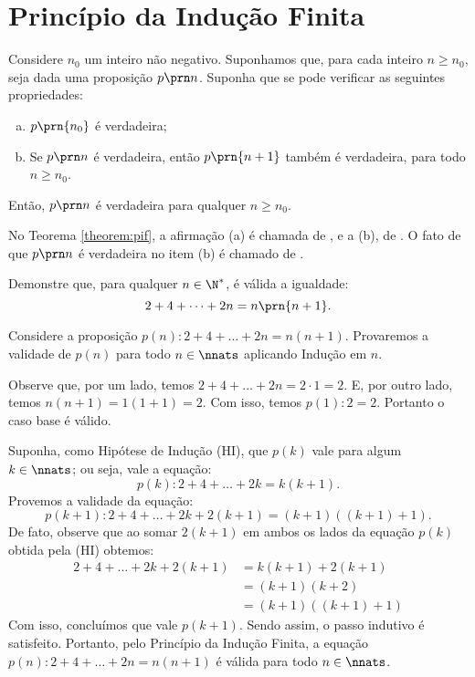\section{Princípio da Indução Finita}

\begin{theorem}
\label{theorem:pif}
Considere $n_0$ um inteiro não negativo. Suponhamos que, para cada inteiro $n \geq n_0$, seja dada uma proposição $p \prn n$. Suponha
que se pode verificar as seguintes propriedades:

\begin{enumerate}[(a)]
  \item $p \prn{n_0}$ é verdadeira;
  \item Se $p \prn n$ é verdadeira, então $p \prn {n+1}$ também
  é verdadeira, para todo $n \geq n_0$.
\end{enumerate}

\noindent Então, $p \prn n$ é verdadeira para qualquer $n \geq n_0$.
\end{theorem}

\begin{remark}
No Teorema \ref{theorem:pif}, a afirmação (a) é chamada de , e a (b), de . O fato de que $p \prn n$ é verdadeira no item (b) é chamado de .
\end{remark}

\begin{example}
Demonstre que, para qualquer $n \in \N^*$, é válida a igualdade:
%
$$2+ 4+ \dots + 2n = n \prn {n+1}.$$
\end{example}

\begin{solution}
Considere a proposição $p(n) : 2+4+\dots + 2n = n(n+1)$.
Provaremos a validade de $p(n)$ para todo $n \in \nnats$ aplicando Indução em $n$.

Observe que, por um lado, temos $2+ 4+ \dots + 2n = 2 \cdot 1 = 2$. E, por outro lado, temos $n(n + 1) = 1(1 + 1) = 2$. Com isso, temos $p(1): 2=2$. Portanto o caso base é válido.

Suponha, como Hipótese de Indução (HI), que $p(k)$ vale para algum $k \in \nnats$; ou seja, vale a equação:
$$p(k) : 2+4+\dots+2k=k(k+1).$$
Provemos a validade da equação:
$$p(k+1) : 2+4+\dots + 2k + 2(k+1) = (k+1)((k+1)+1).$$
De fato, observe que ao somar $2(k+1)$ em ambos os lados da equação $p(k)$ obtida pela (HI) obtemos:
\begin{align*}
2+4+\dots+2k +2(k+1)	&= k(k+1) + 2(k+1) \\
&= (k+1)(k+2) \\
&= (k+1)((k+1)+1)
\end{align*}
Com isso, concluímos que vale $p(k+1)$. Sendo assim, o passo indutivo é satisfeito.
Portanto, pelo Princípio da Indução Finita, a equação $p(n) : 2+4+\dots + 2n=n(n+1)$ é válida para todo $n \in \nnats$.
\end{solution}

